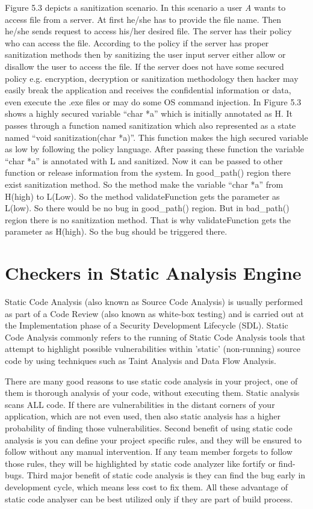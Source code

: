  Figure 5.3 depicts a sanitization scenario. In this scenario a user \emph{A} wants to access file from a server. At first he/she has to provide the file name. Then he/she sends request to access his/her desired file. The server has their policy who can access the file. According to the policy if the server has proper sanitization methods then by sanitizing the user input server either allow or disallow the user to access the file. If the server does not have some secured policy e.g. encryption, decryption or sanitization methodology then hacker may easily break the application and receives the confidential information or data, even execute the .exe files or may do some OS command injection. In Figure 5.3 shows a highly secured variable \enquote{char *a} which is initially annotated as H. It passes through a function named sanitization which also represented as a state named \enquote{void sanitization(char *a)}. This function makes the high secured variable as low by following the policy language. After passing these function the variable \enquote{char *a} is annotated with L and sanitized. Now it can be passed to other function or release information from the system. In good\_path() region there exist sanitization method. So the method make the variable \enquote{char *a} from H(high) to L(Low). So the method validateFunction gets the parameter as L(low). So there would be no bug in good\_path() region. But in bad\_path() region there is no sanitization method. That is why validateFunction gets the parameter as H(high). So the bug should be triggered there.



\section{Checkers in Static Analysis Engine}

Static Code Analysis (also known as Source Code Analysis) is usually performed as part of a Code Review (also known as white-box testing) and is carried out at the Implementation phase of a Security Development Lifecycle (SDL). Static Code Analysis commonly refers to the running of Static Code Analysis tools that attempt to highlight possible vulnerabilities within 'static' (non-running) source code by using techniques such as Taint Analysis and Data Flow Analysis.

There are many good reasons to use static code analysis in your project, one of them is thorough analysis of your code, without executing them. Static analysis scans ALL code. If there are vulnerabilities in the distant corners of your application, which are not even used, then also static analysis has a higher probability of finding those vulnerabilities. Second benefit of using static code analysis is you can define your project specific rules, and they will be ensured to follow without any manual intervention. If any team member forgets to follow those rules, they will be highlighted by static code analyzer like fortify or find-bugs. Third major benefit of static code analysis is they can find the bug early in development cycle, which means less cost to fix them. All these advantage of static code analyser can be best utilized only if they are part of build process.


